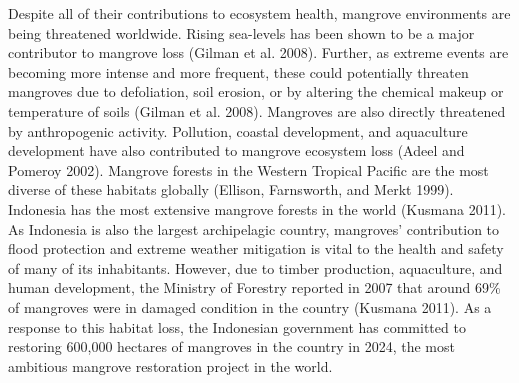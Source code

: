 \documentclass[
]{article}
\begin{document}
Despite all of their contributions to ecosystem health, mangrove environments are being threatened worldwide. Rising sea-levels has been shown to be a major contributor to mangrove loss (Gilman et al. 2008). Further, as extreme events are becoming more intense and more frequent, these could potentially threaten mangroves due to defoliation, soil erosion, or by altering the chemical makeup or temperature of soils (Gilman et al. 2008). Mangroves are also directly threatened by anthropogenic activity. Pollution, coastal development, and aquaculture development have also contributed to mangrove ecosystem loss (Adeel and Pomeroy 2002). Mangrove forests in the Western Tropical Pacific are the most diverse of these habitats globally (Ellison, Farnsworth, and Merkt 1999). Indonesia has the most extensive mangrove forests in the world (Kusmana 2011). As Indonesia is also the largest archipelagic country, mangroves' contribution to flood protection and extreme weather mitigation is vital to the health and safety of many of its inhabitants. However, due to timber production, aquaculture, and human development, the Ministry of Forestry reported in 2007 that around 69\% of mangroves were in damaged condition in the country (Kusmana 2011). As a response to this habitat loss, the Indonesian government has committed to restoring 600,000 hectares of mangroves in the country in 2024, the most ambitious mangrove restoration project in the world.
\end{document}

